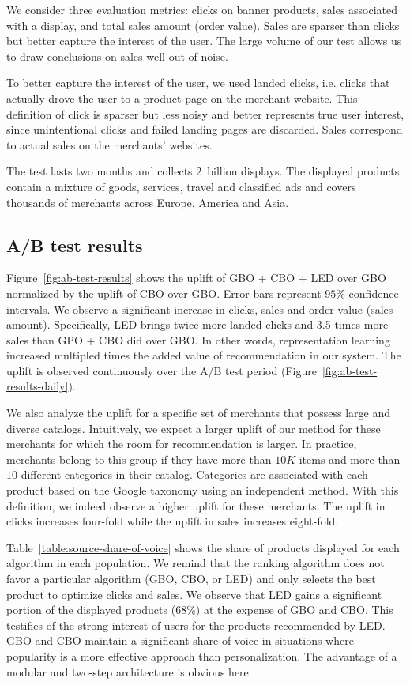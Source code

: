 \documentclass[sigconf]{acmart}
\begin{document}
We consider three evaluation metrics: clicks on banner products, sales associated with a display, and total sales amount (order value). Sales are sparser than clicks but better capture the interest of the user. The large volume of our test allows us to draw conclusions on sales well out of noise.

To better capture the interest of the user, we used landed clicks, i.e. clicks that actually drove the user to a product page on the merchant website. This definition of click is sparser but less noisy and better represents true user interest, since unintentional clicks and failed landing pages are discarded. Sales correspond to actual sales on the merchants' websites.

The test lasts two months and collects $2$~billion displays. The displayed products contain a mixture of goods, services, travel and classified ads and covers thousands of merchants across Europe, America and Asia.

\subsection{A/B test results}
\label{ab-test-results}
 Figure~\ref{fig:ab-test-results} shows the uplift of GBO + CBO + LED over GBO normalized by the uplift of CBO over GBO. Error bars represent $95\%$ confidence intervals. We observe a significant increase in clicks, sales and order value (sales amount). Specifically, LED brings twice more landed clicks and 3.5 times more sales than GPO + CBO did over GBO. In other words, representation learning increased multipled times the added value of recommendation in our system. The uplift is observed continuously over the A/B test period (Figure~\ref{fig:ab-test-results-daily}).
 
 We also analyze the uplift for a specific set of merchants that possess large and diverse catalogs. Intuitively, we expect a larger uplift of our method for these merchants for which the room for recommendation is larger. In practice, merchants belong to this group if they have more than $10K$ items and more than $10$ different categories in their catalog. Categories are associated with each product based on the Google taxonomy using an independent method. With this definition, we indeed observe a higher uplift for these merchants. The uplift in clicks increases four-fold while the uplift in sales increases eight-fold.

Table~\ref{table:source-share-of-voice} shows the share of products displayed for each algorithm in each population. We remind that the ranking algorithm does not favor a particular algorithm (GBO, CBO, or LED) and only selects the best product to optimize clicks and sales. We observe that LED gains a significant portion of the displayed products ($68\%$) at the expense of GBO and CBO. This testifies of the strong interest of users for the products recommended by LED. GBO and CBO maintain a significant share of voice in situations where popularity is a more effective approach than personalization. The advantage of a modular and two-step architecture is obvious here.
\end{document}
